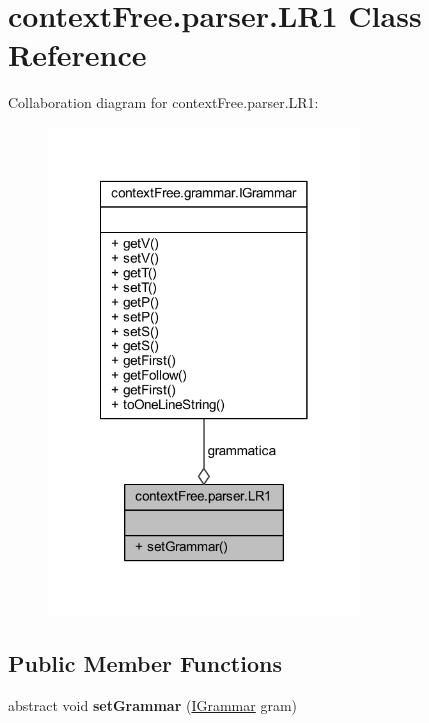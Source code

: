\hypertarget{classcontext_free_1_1parser_1_1_l_r1}{\section{context\-Free.\-parser.\-L\-R1 Class Reference}
\label{classcontext_free_1_1parser_1_1_l_r1}
}


Collaboration diagram for context\-Free.\-parser.\-L\-R1\-:
\nopagebreak
\begin{figure}[H]
\begin{center}
\leavevmode
\includegraphics[width=234pt]{classcontext_free_1_1parser_1_1_l_r1__coll__graph}
\end{center}
\end{figure}
\subsection*{Public Member Functions}
\begin{DoxyCompactItemize}
\item 
\hypertarget{classcontext_free_1_1parser_1_1_l_r1_a464d377de8e3484383068a547208dab5}{abstract void {\bfseries set\-Grammar} (\hyperlink{interfacecontext_free_1_1grammar_1_1_i_grammar}{I\-Grammar} gram)}\label{classcontext_free_1_1parser_1_1_l_r1_a464d377de8e3484383068a547208dab5}

\end{DoxyCompactItemize}
